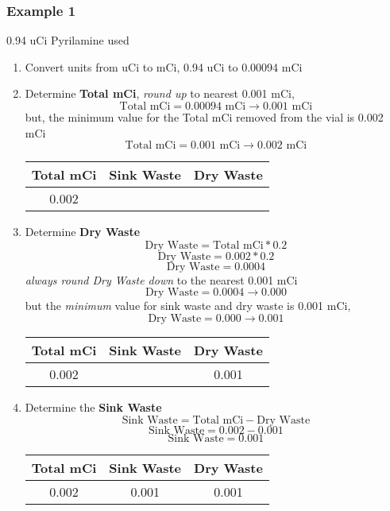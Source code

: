 \documentclass[12pt, letterpaper]{article}
\begin{document}
\subsubsection{Example 1}
0.94 uCi Pyrilamine used
\begin{enumerate}
    \item Convert units from uCi to mCi, 0.94 uCi to 0.00094 mCi
    \item Determine \textbf{Total mCi}, \emph{round up} to nearest 0.001 mCi,
    \[ \text{Total mCi} = 0.00094 \text{ mCi}  \rightarrow 0.001 \text{ mCi} \]
    but, the minimum value for the Total mCi removed from the vial is 0.002 mCi
    \[ \text{Total mCi} = 0.001 \text{ mCi}  \rightarrow 0.002 \text{ mCi} \]
    \begin{table}[ht]
        \centering
        \begin{tabular}{|c|c|c|}
            \hline
            \textbf{Total mCi} & \textbf{Sink Waste} & \textbf{Dry Waste} \\
            \hline
            0.002 &  &  \\
            \hline
        \end{tabular}
    \end{table}
    \item Determine \textbf{Dry Waste}
    \[ \text{Dry Waste} = \text{Total mCi} * 0.2 \]
    \[ \text{Dry Waste} = 0.002 * 0.2 \]
    \[ \text{Dry Waste} = 0.0004 \]
    \emph{always round Dry Waste down} to the nearest 0.001 mCi
    \[ \text{Dry Waste} = 0.0004 \rightarrow 0.000 \]
    but the \emph{minimum} value for sink waste and dry waste is 0.001 mCi,
    \[ \text{Dry Waste} = 0.000 \rightarrow 0.001 \]
    \begin{table}[ht]
        \centering
        \begin{tabular}{|c|c|c|}
            \hline
            \textbf{Total mCi} & \textbf{Sink Waste} & \textbf{Dry Waste} \\
            \hline
            0.002 & & 0.001 \\
            \hline
        \end{tabular}
    \end{table}
    \item Determine the \textbf{Sink Waste}
    \[ \text{Sink Waste} = \text{Total mCi} - \text{Dry Waste} \]
    \[ \text{Sink Waste} = 0.002 - 0.001 \]
    \[ \text{Sink Waste} = 0.001 \]
    \begin{table}[ht]
        \centering
        \begin{tabular}{|c|c|c|}
            \hline
            \textbf{Total mCi} & \textbf{Sink Waste} & \textbf{Dry Waste} \\
            \hline
            0.002 & 0.001 & 0.001 \\
            \hline
        \end{tabular}
    \end{table}
\end{enumerate}
\end{document}
